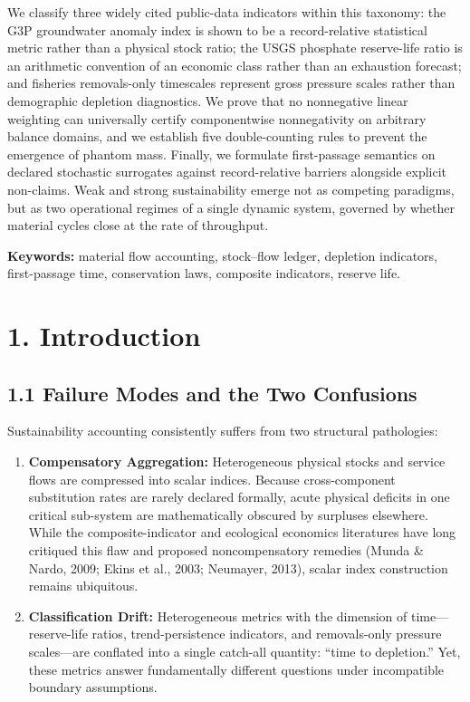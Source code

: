 \documentclass[11pt]{article}
\begin{document}
We classify three widely cited public-data indicators within this taxonomy: the G3P groundwater anomaly index is shown to be a record-relative statistical metric rather than a physical stock ratio; the USGS phosphate reserve-life ratio is an arithmetic convention of an economic class rather than an exhaustion forecast; and fisheries removals-only timescales represent gross pressure scales rather than demographic depletion diagnostics. We prove that no nonnegative linear weighting can universally certify componentwise nonnegativity on arbitrary balance domains, and we establish five double-counting rules to prevent the emergence of phantom mass. Finally, we formulate first-passage semantics on declared stochastic surrogates against record-relative barriers alongside explicit non-claims. Weak and strong sustainability emerge not as competing paradigms, but as two operational regimes of a single dynamic system, governed by whether material cycles close at the rate of throughput.

\textbf{Keywords:} material flow accounting, stock--flow ledger, depletion indicators, first-passage time, conservation laws, composite indicators, reserve life.

\section*{1. Introduction}\label{introduction}

\subsection*{1.1 Failure Modes and the Two Confusions}\label{11-failure-modes-and-the-two-confusions}

Sustainability accounting consistently suffers from two structural pathologies:

\begin{enumerate}\setlength{\itemsep}{2pt}
\item \textbf{Compensatory Aggregation:} Heterogeneous physical stocks and service flows are compressed into scalar indices. Because cross-component substitution rates are rarely declared formally, acute physical deficits in one critical sub-system are mathematically obscured by surpluses elsewhere. While the composite-indicator and ecological economics literatures have long critiqued this flaw and proposed noncompensatory remedies (Munda \& Nardo, 2009; Ekins et al., 2003; Neumayer, 2013), scalar index construction remains ubiquitous.
\item \textbf{Classification Drift:} Heterogeneous metrics with the dimension of time---reserve-life ratios, trend-persistence indicators, and removals-only pressure scales---are conflated into a single catch-all quantity: ``time to depletion.'' Yet, these metrics answer fundamentally different questions under incompatible boundary assumptions.
\end{enumerate}
\end{document}

